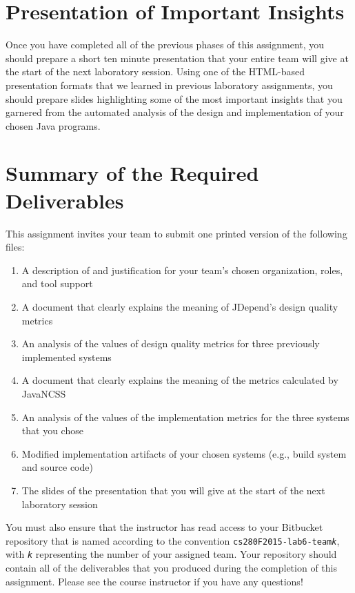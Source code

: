 \section*{Presentation of Important Insights}

Once you have completed all of the previous phases of this assignment, you should prepare a short ten minute
presentation that your entire team will give at the start of the next laboratory session. Using one of the HTML-based
presentation formats that we learned in previous laboratory assignments, you should prepare slides highlighting some of
the most important insights that you garnered from the automated analysis of the design and implementation of your
chosen Java programs.

\section*{Summary of the Required Deliverables}

This assignment invites your team to submit one printed version of the following files:
\vspace*{-.1in}
\begin{enumerate}
	\itemsep0em
	\item A description of and justification for your team's chosen organization, roles, and tool support
	\item A document that clearly explains the meaning of JDepend's design quality metrics
	\item An analysis of the values of design quality metrics for three previously implemented systems
	\item A document that clearly explains the meaning of the metrics calculated by JavaNCSS
	\item An analysis of the values of the implementation metrics for the three systems that you chose
	\item Modified implementation artifacts of your chosen systems (e.g., build system and source code)
	\item The slides of the presentation that you will give at the start of the next laboratory session
\end{enumerate}
\vspace*{-.1in}

You must also ensure that the instructor has read access to your Bitbucket repository that is named according to the
convention {\tt cs280F2015-lab6-team{\em k}}, with {\tt {\em k}} representing the number of your assigned team.  Your
repository should contain all of the deliverables that you produced during the completion of this assignment.  Please
see the course instructor if you have any questions!


